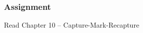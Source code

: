 \documentclass[color=usenames,dvipsnames,handout]{beamer}\usepackage[]{graphicx}\usepackage[]{xcolor}
\begin{document}




\begin{frame}
  \frametitle{Assignment}
  \Large
  \begin{center}
    Read Chapter 10 -- Capture-Mark-Recapture
  \end{center}
\end{frame}
\end{document}
